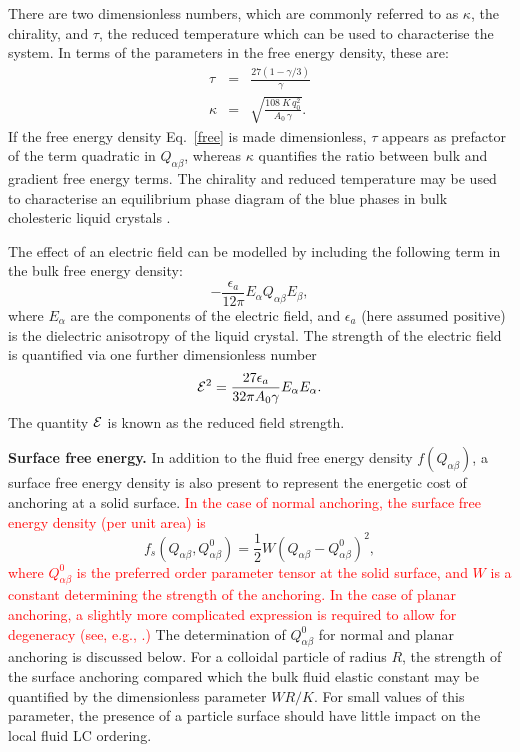 \documentclass[12pt]{article}
\begin{document}
There are two dimensionless numbers, which are commonly referred to as
$\kappa$, the chirality, and  $\tau$, the reduced temperature
\cite{mermin} which can be used to characterise the system. In terms of
the parameters in the free energy density, these are:
\begin{eqnarray}\label{cntrl-param} 
\tau&=&\frac{27(1-\gamma/3)}{\gamma}\label{tau}\\
\kappa&=&\sqrt{\frac{108\ K\, q_0^2}{A_0\, \gamma}}\label{kappa}.
\end{eqnarray}
If the free energy density Eq.~\ref{free} is made dimensionless, $\tau$
appears as prefactor of the term  quadratic in $Q_{\alpha\beta}$,
whereas $\kappa$
quantifies the ratio between bulk and  gradient free energy terms. The
chirality and reduced temperature may be used to characterise an equilibrium
phase diagram of the blue phases in bulk cholesteric liquid crystals
\cite{mermin,henrichfield}.

The effect of an electric field can be modelled by including the following
term in the bulk free energy density:
\begin{equation}
-\frac{\epsilon_a}{12\pi} E_{\alpha}Q_{\alpha\beta}E_{\beta},
\end{equation} 
where $E_{\alpha}$ are the components of the electric field, and 
$\epsilon_a$ (here assumed positive) is the dielectric anisotropy of the liquid
crystal. The strength of the electric field is quantified via
one further dimensionless number
\begin{equation}
{\cal E}^2 = \frac{27 \epsilon_a}{32 \pi A_0 \gamma} E_\alpha E_\alpha.
\end{equation}
The quantity ${\cal E}$ is known as the reduced field strength.


\medskip
\noindent
\textbf{Surface free energy.}
In addition to the fluid free energy density $f(Q_{\alpha\beta})$, a surface
free energy density is also present to represent the energetic cost of
anchoring at a solid surface.
\textcolor{red}{In the case of normal anchoring, the surface free energy
density (per unit area) is}
\begin{equation}
f_s(Q_{\alpha\beta}, Q^0_{\alpha\beta})
= {\textstyle \frac{1}{2}}W(Q_{\alpha\beta} - Q^0_{\alpha\beta})^2,
\end{equation}
\textcolor{red}{where $Q^0_{\alpha\beta}$ is the preferred order
parameter tensor at the solid surface, and $W$ is a constant determining
the strength of the anchoring. In the case of planar anchoring, a slightly
more complicated expression is required to allow for degeneracy
(see, e.g., \cite{fournier2005}.)}
The determination of $Q^0_{\alpha\beta}$ for normal and planar anchoring is
discussed below. For a colloidal particle of radius $R$, the strength of
the surface
anchoring compared which the bulk fluid elastic constant may be quantified
by the dimensionless parameter $WR/K$. For small values of this parameter,
the presence of a particle surface should have little impact on the local
fluid LC ordering.
\end{document}
